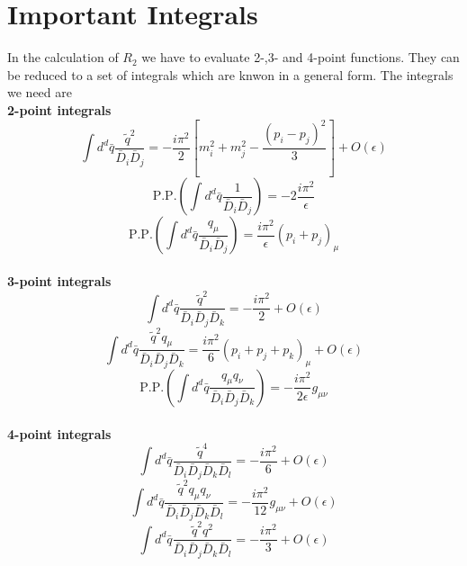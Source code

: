 \section{Important Integrals}
\label{app:Integrals}
In the calculation of $R_2$ we have to evaluate 2-,3- and 4-point functions. They can be reduced to a set of integrals which are knwon in a general form. The integrals we need are \cite{R2QCD} \\

{\bf 2-point integrals}
\begin{equation}
\label{eqn:2ptintq2} 
\int  d^d \bar{q} \frac{\tilde{q}^2}{\bar{D}_i\bar{D}_j} =  -\frac{i\pi^2}{2} \left[ m_i^2 + m_j^2 - \frac{\left( p_i - p_j \right)^2}{3} \right] + O(\epsilon)
\end{equation}
\begin{equation}
\label{eqn:2ptintsca} 
\mathrm{P.P.} \left( \int  d^d \bar{q} \frac{1}{\bar{D}_i\bar{D}_j} \right) = -2\frac{i\pi^2}{\epsilon}
\end{equation}
\begin{equation}
\label{eqn:2ptintq} 
\mathrm{P.P.} \left( \int  d^d \bar{q} \frac{q_{\mu}}{\bar{D}_i\bar{D}_j} \right) =  \frac{i\pi^2}{\epsilon} \left( p_i + p_j \right)_{\mu}
\end{equation}\\

{\bf 3-point integrals} 
\begin{equation}
\label{eqn:3ptintq2}
\int  d^d \bar{q} \frac{\tilde{q}^2}{\bar{D}_i\bar{D}_j\bar{D}_k} = -\frac{i\pi^2}{2} + O(\epsilon)
\end{equation}
\begin{equation}
\label{eqn:3ptintq3}
\int  d^d \bar{q} \frac{\tilde{q}^2q_{\mu}}{\bar{D}_i\bar{D}_j\bar{D}_k} = \frac{i\pi^2}{6} \left( p_i + p_j + p_k \right)_{\mu} + O(\epsilon)
\end{equation}
\begin{equation}
\label{eqn:3ptintq2vec}
\mathrm{P.P.} \left( \int  d^d \bar{q} \frac{q_{\mu}q_{\nu}}{\bar{D}_i\bar{D}_j\bar{D}_k} \right) =  -\frac{i\pi^2}{2\epsilon} g_{\mu\nu}
\end{equation}\\

{\bf 4-point integrals} 
\begin{equation}
\label{eqn:4ptintq4}
\int  d^d \bar{q} \frac{\tilde{q}^4}{\bar{D}_i\bar{D}_j\bar{D}_k\bar{D}_l} =  -\frac{i\pi^2}{6} + O(\epsilon)
\end{equation}
\begin{equation}
\label{eqn:4ptintvec}
\int  d^d \bar{q} \frac{\tilde{q}^2q_{\mu}q_{\nu}}{\bar{D}_i\bar{D}_j\bar{D}_k\bar{D}_l} =  -\frac{i\pi^2}{12} g_{\mu\nu} + O(\epsilon)
\end{equation}
\begin{equation}
\label{eqn:4ptintq2q2}
\int  d^d \bar{q} \frac{\tilde{q}^2 q^2}{\bar{D}_i\bar{D}_j\bar{D}_k\bar{D}_l} =  -\frac{i\pi^2}{3} + O(\epsilon) 
\end{equation}

